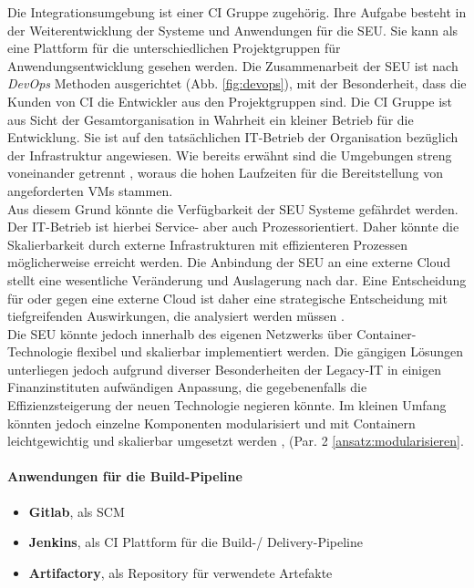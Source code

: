Die Integrationsumgebung ist einer \ac{CI} Gruppe zugehörig. Ihre Aufgabe besteht in der Weiterentwicklung der Systeme und Anwendungen für die \ac{SEU}. Sie kann als eine Plattform für die unterschiedlichen Projektgruppen für Anwendungsentwicklung gesehen werden.
Die Zusammenarbeit der \ac{SEU} ist nach \emph{DevOps} Methoden ausgerichtet (Abb. \ref{fig:devops}), mit der Besonderheit, dass die Kunden von \ac{CI} die Entwickler aus den Projektgruppen sind. Die \ac{CI} Gruppe ist aus Sicht der Gesamtorganisation in Wahrheit ein kleiner Betrieb für die Entwicklung. Sie ist auf den tatsächlichen IT-Betrieb der Organisation bezüglich der Infrastruktur angewiesen. Wie bereits erwähnt sind die Umgebungen streng voneinander getrennt \cite{MaRisk:2017}, woraus die hohen Laufzeiten für die Bereitstellung von angeforderten \ac{VMs} stammen. 
\medskip
\\
Aus diesem Grund könnte die Verfügbarkeit der \ac{SEU} Systeme gefährdet werden. Der IT-Betrieb ist hierbei Service- aber auch Prozessorientiert. Daher könnte die Skalierbarkeit durch externe Infrastrukturen mit effizienteren Prozessen möglicherweise erreicht werden. Die Anbindung der \ac{SEU} an eine externe Cloud stellt eine wesentliche Veränderung und Auslagerung nach \cite{MaRisk:2017, BAIT:2018} dar. Eine Entscheidung für oder gegen eine externe Cloud ist daher eine strategische Entscheidung mit tiefgreifenden Auswirkungen, die analysiert werden müssen \cite{recht/Bornemann2018, MaRisk:2017, BAIT:2018}.
\medskip
\\
Die \ac{SEU} könnte jedoch innerhalb des eigenen Netzwerks über Container-Technologie flexibel und skalierbar implementiert werden. Die gängigen Lösungen \cite{Pathania2017, Google:GKEJenkins} unterliegen jedoch aufgrund diverser Besonderheiten der Legacy-IT in einigen Finanzinstituten \cite{Brockhoff2006, Bussmann2006} aufwändigen Anpassung, die gegebenenfalls die Effizienzsteigerung der neuen Technologie negieren könnte. Im kleinen Umfang könnten jedoch einzelne Komponenten modularisiert und mit Containern leichtgewichtig und skalierbar umgesetzt werden \cite{Bussmann2006}, (Par. 2 \ref{ansatz:modularisieren}.

\paragraph{Anwendungen für die Build-Pipeline}
\begin{itemize}
    \item \textbf{Gitlab}, als \ac{SCM}
    \item \textbf{Jenkins}, als \ac{CI} Plattform für die Build-/ Delivery-Pipeline
    \item \textbf{Artifactory}, als Repository für verwendete Artefakte
\end{itemize}



